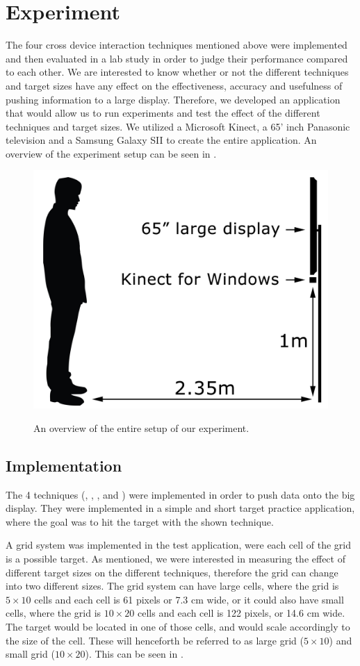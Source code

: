 \section{Experiment} \label{sec:experiment}
The four cross device interaction techniques mentioned above were implemented and then evaluated in a lab study in order to judge their performance compared to each other. 
We are interested to know whether or not the different techniques and target sizes have any effect on the effectiveness, accuracy and usefulness of pushing information to a large display. Therefore, we developed an application that would allow us to run experiments and test the effect of the different techniques and target sizes. 
We utilized a Microsoft Kinect, a 65' inch Panasonic television and a Samsung Galaxy SII to create the entire application. 
An overview of the experiment setup can be seen in . 

\begin{figure}[H]
	\centering
	{\includegraphics[width = 0.7\columnwidth]{images/SetupIllustration.jpg}}
	\caption{
		\protect An overview of the entire setup of our experiment.
	}
	\label{fig:entireSetup}
\end{figure}

\subsection{Implementation}

The 4 techniques (\swipe, \tilt, \throw, and \pinch) were implemented in order to push data onto the big display. 
They were implemented in a simple and short target practice application, where the goal was to hit the target with the shown technique. 

A grid system was implemented in the test application, were each cell of the grid is a possible target. 
As mentioned, we were interested in measuring the effect of different target sizes on the different techniques, therefore the grid can change into two different sizes. 
The grid system can have large cells, where the grid is $5 \times 10$ cells and each cell is 61 pixels or 7.3 cm wide, or it could also have small cells, where the grid is $10 \times 20$ cells and each cell is 122 pixels, or 14.6 cm wide. 
The target would be located in one of those cells, and would scale accordingly to the size of the cell.
These will henceforth be referred to as large grid ($5 \times 10$) and small grid ($10 \times 20$). This can be seen in . 

